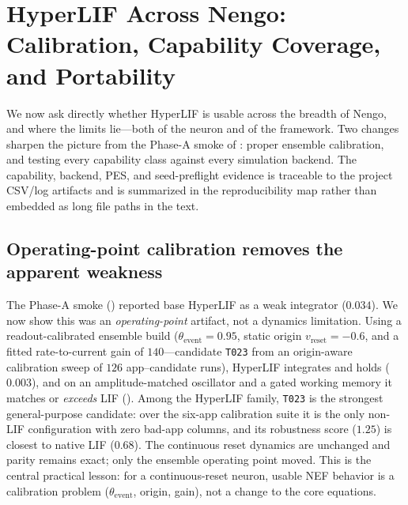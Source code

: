 \documentclass[11pt]{article}
\newcommand{\vre}{v_{\mathrm{reset}}}
\newcommand{\thetaevent}{\theta_{\mathrm{event}}}
\newcommand{\code}[1]{\texttt{#1}}
\begin{document}
\section{HyperLIF Across Nengo: Calibration, Capability Coverage, and Portability}
\label{sec:capability}
We now ask directly whether HyperLIF is usable across the breadth of Nengo, and
where the limits lie---both of the neuron and of the framework. Two changes
sharpen the picture from the Phase-A smoke of : proper
ensemble calibration, and testing every capability class against every
simulation backend. The capability, backend, PES, and seed-preflight evidence is
traceable to the project CSV/log artifacts and is summarized in the
reproducibility map rather than embedded as long file paths in the text.

\subsection{Operating-point calibration removes the apparent weakness}
The Phase-A smoke () reported base HyperLIF as a weak
integrator (\(0.034\)). We now show this was an \emph{operating-point} artifact,
not a dynamics limitation. Using a readout-calibrated ensemble build
(\(\thetaevent=0.95\), static origin \(\vre=-0.6\), and a fitted rate-to-current
gain of \(140\)---candidate \code{T023} from an origin-aware calibration sweep of
\(126\) app--candidate runs), HyperLIF integrates and holds (\(0.003\)), and on an
amplitude-matched oscillator and a gated working memory it matches or
\emph{exceeds} LIF (). Among the HyperLIF family,
\code{T023} is the strongest general-purpose candidate: over the six-app
calibration suite it is the only non-LIF configuration with zero bad-app columns,
and its robustness score (\(1.25\)) is closest to native LIF (\(0.68\)). The
continuous reset dynamics are unchanged and parity remains exact; only the
ensemble operating point moved. This is the central practical lesson: for a
continuous-reset neuron, usable NEF behavior is a calibration problem
(\(\thetaevent\), origin, gain), not a change to the core equations.
\end{document}
